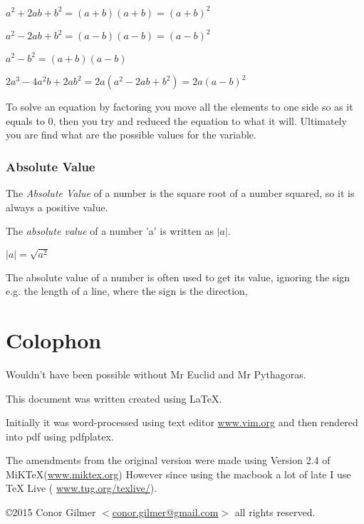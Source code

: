 \documentclass{article}
\begin{document}
$a^{2} + 2ab + b^{2} = (a + b) (a + b)  = (a + b)^{2}$

$a^{2} - 2ab + b^{2} = (a - b) (a - b)  = (a - b)^{2}$

$a^{2} - b^{2} = (a + b) (a - b)$

$2a^{3} -4a^{2}b + 2ab^{2} = 2a ( a^{2} - 2ab + b^{2} ) = 2a (a-b)^{2}$

To solve an equation by factoring you move all the elements to one side so as it equals to 0,
then you try and reduced the equation to what it will.
Ultimately you are find what are the possible values for the variable.

\subsubsection{Absolute Value}
The \textit{Absolute Value} of a number is the square root of a number squared, so it is always a positive value. 

The \textit{absolute value} of a number 'a' is written as $|a|$.

$ |a| = \sqrt{a^{2}}$ 

The absolute value of a number is often used to get its value, ignoring the sign e.g. the length of a line, where the sign is the direction,

\newpage
\section{Colophon}

Wouldn't have been possible without Mr Euclid and Mr Pythagoras.

This document was written created using \LaTeX{}. 

Initially it was word-processed using text editor \href{http://www.vim.org}{www.vim.org} and then rendered into pdf using pdfplatex. 

The amendments from the original version were made using Version 2.4 of MiKTeX(\href{http://www.miktex.org}{www.miktex.org})
However since using the macbook a lot of late I use \TeX{} Live ( \href{https://www.tug.org/texlive/}{www.tug.org/texlive/}).





\copyright 2015 Conor Gilmer $<$\href{mailto:conor.gilmer@gmail.com}{conor.gilmer@gmail.com}$>$ all rights reserved.
\end{document}
